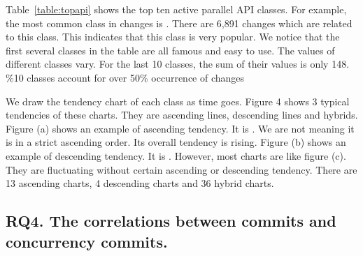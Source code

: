 Table~\ref{table:topapi} shows the top ten active parallel API classes.  For example, the most common class in changes is . There are 6,891 changes which are related to this class. This indicates that this class is very popular. We notice that the first several classes in the table are all famous and easy to use. The values of different classes vary. For the last 10 classes, the sum of their values is only 148. \%10 classes account for over 50\% occurrence of changes

We draw the tendency chart of each class as time goes. Figure 4 shows 3 typical tendencies of these charts. They are ascending lines, descending lines and hybrids. Figure (a) shows an example of ascending tendency. It is . We are not meaning it is in a strict ascending order. Its overall tendency is rising. Figure (b) shows an example of descending tendency. It is . However, most charts are like figure (c). They are fluctuating without certain ascending or descending tendency. There are 13 ascending charts, 4 descending charts and 36 hybrid charts.



\subsection{RQ4. The correlations between commits and concurrency commits.}


